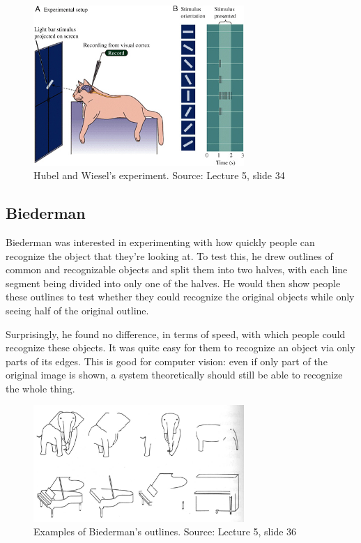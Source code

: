 \documentclass{article}
\begin{document}
\begin{figure}[H]
\centering
\includegraphics[width=8cm]{hubel_wiesel_cat.jpg}
\caption{Hubel and Wiesel's experiment. Source: Lecture 5, slide 34}
\end{figure}

\subsection{Biederman}
Biederman was interested in experimenting with how quickly people can recognize the object that they're looking at. To test this, he drew outlines of common and recognizable objects and split them into two halves, with each line segment being divided into only one of the halves. He would then show people these outlines to test whether they could recognize the original objects while only seeing half of the original outline. \newline

Surprisingly, he found no difference, in terms of speed, with which people could recognize these objects. It was quite easy for them to recognize an object via only parts of its edges. This is good for computer vision: even if only part of the original image is shown, a system theoretically should still be able to recognize the whole thing.

\begin{figure}[H]
\centering
\includegraphics[width=8cm]{biederman_outlines.png}
\caption{Examples of Biederman's outlines. Source: Lecture 5, slide 36}
\end{figure}
\end{document}

